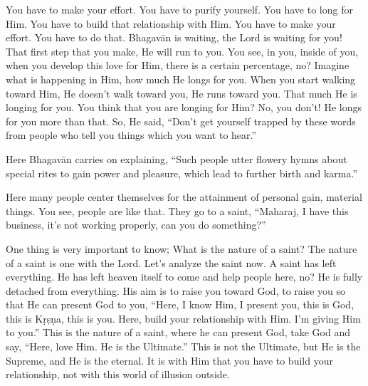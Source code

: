 You have to make your effort. You have to purify yourself. You have to long for Him. You have to build that relationship with Him. You have to make your effort. You have to do that. Bhagavān is waiting, the Lord is waiting for you! That first step that you make, He will run to you. You see, in you, inside of you, when you develop this love for Him, there is a certain percentage, no? Imagine what is happening in Him, how much He longs for you. When you start walking toward Him, He doesn’t walk toward you, He runs toward you. That much He is longing for you. You think that you are longing for Him? No, you don’t! He longs for you more than that. So, He said, “Don’t get yourself trapped by these words from people who tell you things which you want to hear.”

Here Bhagavān carries on explaining, “Such people utter flowery hymns about special rites to gain power and pleasure, which lead to further birth and karma.”

Here many people center themselves for the attainment of personal gain, material things. You see, people are like that. They go to a saint, “Maharaj, I have this business, it’s not working properly, can you do something?”

One thing is very important to know; What is the nature of a saint? The nature of a saint is one with the Lord. Let’s analyze the saint now. A saint has left everything. He has left heaven itself to come and help people here, no? He is fully detached from everything. His aim is to raise you toward God, to raise you so that He can present God to you, “Here, I know Him, I present you, this is God, this is Kṛṣṇa, this is you. Here, build your relationship with Him. I’m giving Him to you.” This is the nature of a saint, where he can present God, take God and say, “Here, love Him. He is the Ultimate.” This is not the Ultimate, but He is the Supreme, and He is the eternal. It is with Him that you have to build your relationship, not with this world of illusion outside.

